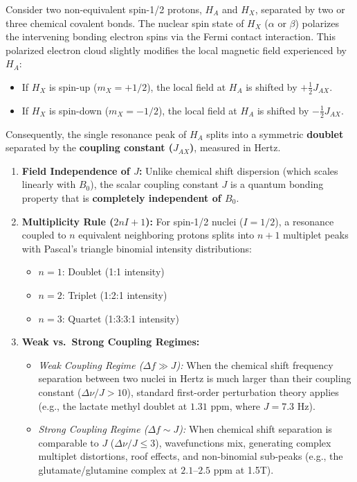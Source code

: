 \documentclass[11pt,a4paper]{article}
\begin{document}
Consider two non-equivalent spin-1/2 protons, $H_A$ and $H_X$, separated by two or three chemical covalent bonds. The nuclear spin state of $H_X$ ($\alpha$ or $\beta$) polarizes the intervening bonding electron spins via the Fermi contact interaction. This polarized electron cloud slightly modifies the local magnetic field experienced by $H_A$:
\begin{itemize}
    \item If $H_X$ is spin-up ($m_X = +1/2$), the local field at $H_A$ is shifted by $+\frac{1}{2} J_{AX}$.
    \item If $H_X$ is spin-down ($m_X = -1/2$), the local field at $H_A$ is shifted by $-\frac{1}{2} J_{AX}$.
\end{itemize}
Consequently, the single resonance peak of $H_A$ splits into a symmetric \textbf{doublet} separated by the \textbf{coupling constant ($J_{AX}$)}, measured in Hertz.

\begin{physicsbox}
\begin{enumerate}[leftmargin=1.5em]
    \item \textbf{Field Independence of $J$:} Unlike chemical shift dispersion (which scales linearly with $B_0$), the scalar coupling constant $J$ is a quantum bonding property that is \textbf{completely independent of $B_0$}.
    \item \textbf{Multiplicity Rule ($2nI + 1$):} For spin-1/2 nuclei ($I=1/2$), a resonance coupled to $n$ equivalent neighboring protons splits into $n + 1$ multiplet peaks with Pascal's triangle binomial intensity distributions:
    \begin{itemize}
        \item $n=1$: Doublet (1:1 intensity)
        \item $n=2$: Triplet (1:2:1 intensity)
        \item $n=3$: Quartet (1:3:3:1 intensity)
    \end{itemize}
    \item \textbf{Weak vs.\ Strong Coupling Regimes:}
    \begin{itemize}
        \item \textit{Weak Coupling Regime ($\Delta f \gg J$):} When the chemical shift frequency separation between two nuclei in Hertz is much larger than their coupling constant ($\Delta \nu / J > 10$), standard first-order perturbation theory applies (e.g., the lactate methyl doublet at $1.31\text{ ppm}$, where $J = 7.3\text{ Hz}$).
        \item \textit{Strong Coupling Regime ($\Delta f \sim J$):} When chemical shift separation is comparable to $J$ ($\Delta \nu / J \le 3$), wavefunctions mix, generating complex multiplet distortions, roof effects, and non-binomial sub-peaks (e.g., the glutamate/glutamine complex at $2.1\text{--}2.5\text{ ppm}$ at 1.5T).
    \end{itemize}
\end{enumerate}
\end{physicsbox}
\end{document}
